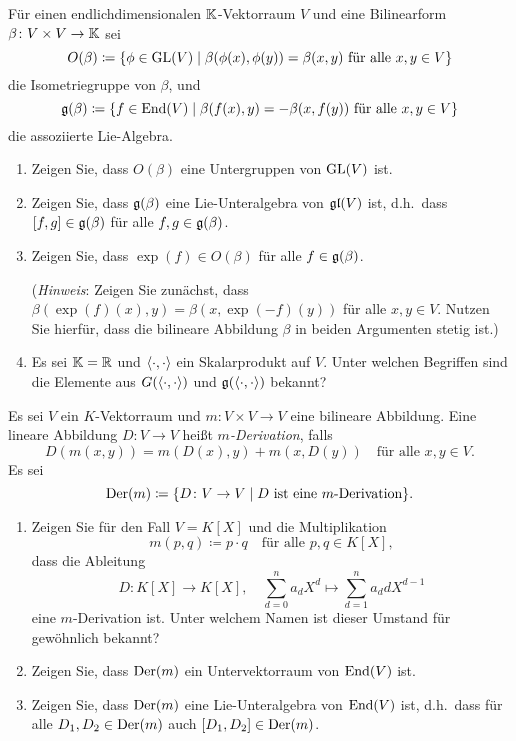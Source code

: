 \documentclass[a4paper,10pt]{scrartcl}
\begin{document}
\begin{question}
  Für einen endlichdimensionalen $\mathbb{K}$-Vektorraum $V$ und eine Bilinearform $\beta \colon V \times V \to \mathbb{K}$ sei
  \[
              O(\beta)
    \coloneqq \{ \phi \in \operatorname{GL}(V) \mid \text{$\beta(\phi(x), \phi(y)) = \beta(x,y)$ für alle $x,y \in V$} \}
  \]
  die Isometriegruppe von $\beta$, und
  \[
              \mathfrak{g}(\beta)
    \coloneqq \{ f \in \operatorname{End}(V) \mid \text{$\beta(f(x),y) = -\beta(x, f(y))$ für alle $x, y \in V$} \}
  \]
  die assoziierte Lie-Algebra.
  \begin{enumerate}[leftmargin=*]
    \item
      Zeigen Sie, dass $O(\beta)$ eine Untergruppen von $\operatorname{GL}(V)$ ist.
    \item
      Zeigen Sie, dass $\mathfrak{g}(\beta)$ eine Lie-Unteralgebra von $\mathfrak{gl}(V)$ ist, d.h.\ dass $[f,g] \in \mathfrak{g}(\beta)$ für alle $f, g \in \mathfrak{g}(\beta)$.
    \item
      Zeigen Sie, dass $\exp(f) \in O(\beta)$ für alle $f \in \mathfrak{g}(\beta)$.
      
      (\emph{Hinweis}:
       Zeigen Sie zunächst, dass $\beta(\exp(f)(x) ,y) = \beta(x, \exp(-f)(y))$ für alle $x, y \in V$.
       Nutzen Sie hierfür, dass die bilineare Abbildung $\beta$ in beiden Argumenten stetig ist.)
    \item
      Es sei $\mathbb{K} = \mathbb{R}$ und $\langle \cdot, \cdot \rangle$ ein Skalarprodukt auf $V$.
      Unter welchen Begriffen sind die Elemente aus $G(\langle \cdot, \cdot \rangle)$ und $\mathfrak{g}(\langle \cdot, \cdot \rangle)$ bekannt?
  \end{enumerate}
\end{question}


\begin{question}
  Es sei $V$ ein $K$-Vektorraum und $m \colon V \times V \to V$ eine bilineare Abbildung.
  Eine lineare Abbildung $D \colon V \to V$ heißt \emph{$m$-Derivation}, falls
  \[
    D(m(x,y))
    = m(D(x), y) + m(x, D(y))
    \quad
    \text{für alle $x, y \in V$}.
  \]
  Es sei
  \[
              \operatorname{Der}(m)
    \coloneqq \{ D \colon V \to V \mid \text{$D$ ist eine $m$-Derivation} \}.
  \]
  \begin{enumerate}[leftmargin=*]
    \item
      Zeigen Sie für den Fall $V = K[X]$ und die Multiplikation
      \[
        m(p,q) \coloneqq p \cdot q
        \quad
        \text{für alle $p, q \in K[X]$},
      \]
      dass die Ableitung
      \[
        D \colon K[X] \to K[X],
        \quad
        \sum_{d=0}^n a_d X^d  \mapsto \sum_{d=1}^n a_d d X^{d-1} 
      \]
      eine $m$-Derivation ist.
      Unter welchem Namen ist dieser Umstand für gewöhnlich bekannt?
    \item
      Zeigen Sie, dass $\operatorname{Der}(m)$ ein Untervektorraum von $\operatorname{End}(V)$ ist.
    \item
      Zeigen Sie, dass $\operatorname{Der}(m)$ eine Lie-Unteralgebra von $\operatorname{End}(V)$ ist, d.h.\ dass für alle $D_1, D_2 \in \operatorname{Der}(m)$ auch $[D_1, D_2] \in \operatorname{Der}(m)$.
  \end{enumerate}
\end{question}
\end{document}
